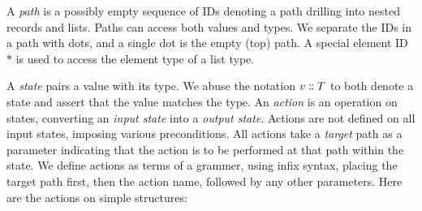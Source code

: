\documentclass[english,submission]{programming}
\theoremstyle{definition}
\newcommand{\mathbox}[1]{\colorbox{black!10}{$#1$}}
\newcommand{\is}{{:}\ }
\newcommand{\isa}{\dblcolon}
\newcommand{\emptystring}{\textsf{\textquotedbl\ \!\textquotedbl}}
\begin{document}
\tcbox{
\[ \begin{array}{r@{\ }l|r@{\ }l|r@{\ }l|l}
  \multicolumn{2}{l|}{\textrm{type}} & \multicolumn{2}{l|}{\textrm{value}} & \multicolumn{2}{l|}{\textrm{initial value}}&\\
  \hline
  T \Coloneqq & & v \Coloneqq & & T^\varnothing = & &\\
  &  \textsf{String} & & S & & \emptystring & \textrm{string}\\
  & \textsf{Number} & &  N & & \textsf{NaN} & \textrm{number}\\
  & \textsf{List } T & & [ E \is v \  \dots ] & & [] & \textrm{list}\\
  & \{ F \  S \is T \  \dots \} & & \{ F \is v \  \dots \} & & \{ F \is T^\varnothing \  \dots \}& \textrm{record}\\

  & \bot && \bigtimes & & \bigtimes & \textrm{tombstone}\\
\end{array}\]
}

A \textit{path} is a possibly empty sequence of IDs denoting a path drilling into nested records and lists. Paths can access both values and types. We separate the IDs in a path with dots, and a single dot is the empty (top) path. A special element ID~\mathbox{*} is used to access the element type of a list type.

A \textit{state} pairs a value with its type. We abuse the notation \mathbox{v \isa T} to both denote a state and assert that the value matches the type.
An \textit{action} is an operation on states, converting an \textit{input state} into a \textit{output state}. Actions are not defined on all input states, imposing various preconditions.
All actions take a \textit{target} path as a parameter indicating that the action is to be performed at that path within the state.
We define actions as terms of a grammer,
using infix syntax, placing the target path first, then the action name, followed by any other parameters. Here are the actions on simple structures:
\end{document}
